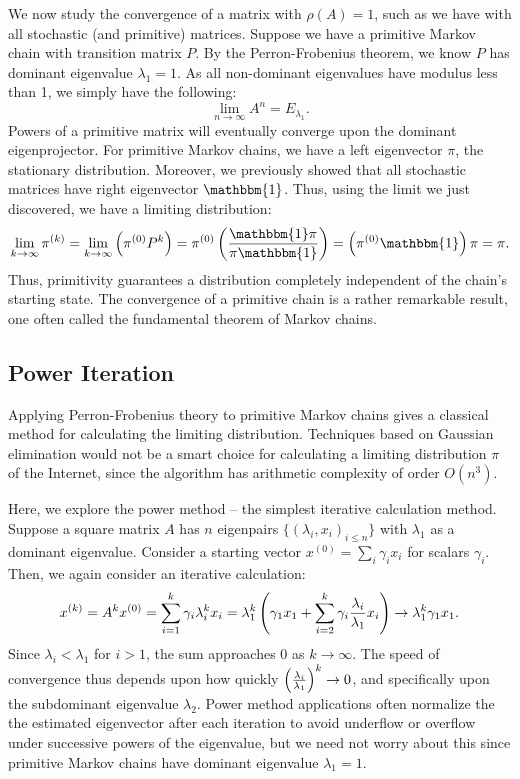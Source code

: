 \documentclass[../exploring-pagerank.tex]{subfiles}
\begin{document}
    We now study the convergence of a matrix with $\rho(A) = 1$, such as we have with all stochastic (and primitive) matrices. Suppose we have a primitive Markov chain with transition matrix $P$. By the Perron-Frobenius theorem, we know $P$ has dominant eigenvalue $\lambda_1 = 1$. As all non-dominant eigenvalues have modulus less than 1, we simply have the following:
    \begin{equation*}
        \lim_{n\to\infty}{A^n} = E_{\lambda_1}.
    \end{equation*}
    Powers of a primitive matrix will eventually converge upon the dominant eigenprojector. For primitive Markov chains, we have a left eigenvector $\pi$, the stationary distribution. Moreover, we previously showed that all stochastic matrices have right eigenvector $\mathbbm{1}$. Thus, using the limit we just discovered, we have a limiting distribution:
    \begin{equation}
        \lim_{k\to\infty}{{\iterate{\pi}{k}}} = \lim_{k\to\infty}{\parens{{\iterate{\pi}{0}} P^k}} = \iterate{\pi}{0} \parens{\frac{\mathbbm{1} \pi}{\pi \mathbbm{1}}} = \parens{\iterate{\pi}{0} \mathbbm{1}} \pi = \pi.
    \end{equation}
    Thus, primitivity guarantees a distribution completely independent of the chain's starting state. The convergence of a primitive chain is a rather remarkable result, one often called the fundamental theorem of Markov chains.

    \subsection{Power Iteration}
    Applying Perron-Frobenius theory to primitive Markov chains gives a classical method for calculating the limiting distribution. Techniques based on Gaussian elimination would not be a smart choice for calculating a limiting distribution $\pi$ of the Internet, since the algorithm has arithmetic complexity of order $O(n^3)$.

    Here, we explore the power method -- the simplest iterative calculation method. Suppose a square matrix $A$ has $n$ eigenpairs $\{ (\lambda_i,x_i)_{i\leq n} \}$ with $\lambda_1$ as a dominant eigenvalue. Consider a starting vector $x^{(0)}=\sum_i{\gamma_i x_i}$ for scalars $\gamma_i$. Then, we again consider an iterative calculation:
	\begin{equation}
		x^{(k)} = A^k x^{(0)} = \sum_{i=1}^{k}{\gamma_i \lambda_i^k x_i} = \lambda_1^k\left( \gamma_1 x_1 + \sum_{i=2}^{k}{\gamma_i \frac{\lambda_i}{\lambda_1} x_i} \right) \to \lambda_1^k \gamma_1 x_1.
	\end{equation}
    Since $\lambda_i<\lambda_1$ for $i>1$, the sum approaches 0 as $k\to\infty$. The speed of convergence thus depends upon how quickly $\left( \frac{\lambda_i}{\lambda_1} \right)^k \to 0$, and specifically upon the subdominant eigenvalue $\lambda_2$. Power method applications often normalize the the estimated eigenvector after each iteration to avoid underflow or overflow under successive powers of the eigenvalue, but we need not worry about this since primitive Markov chains have dominant eigenvalue $\lambda_1 = 1$.
\end{document}
